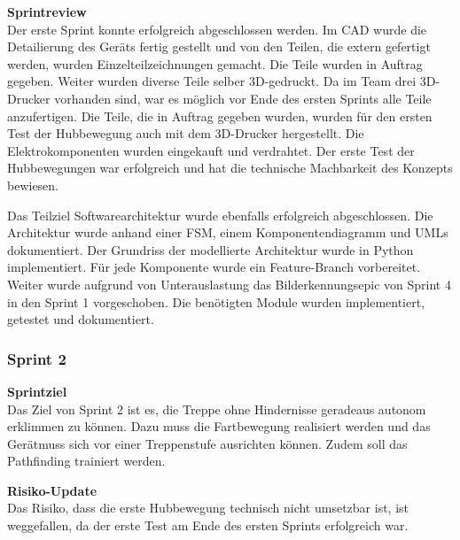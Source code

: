 \textbf{Sprintreview}\\
Der erste Sprint konnte erfolgreich abgeschlossen werden. Im CAD wurde die Detailierung des Geräts fertig gestellt und von den Teilen, die extern gefertigt werden, wurden Einzelteilzeichnungen gemacht. Die Teile wurden in Auftrag gegeben. Weiter wurden diverse Teile selber 3D-gedruckt. Da im Team drei 3D-Drucker vorhanden sind, war es möglich vor Ende des ersten Sprints alle Teile anzufertigen. Die Teile, die in Auftrag gegeben wurden, wurden für den ersten Test der Hubbewegung auch mit dem 3D-Drucker hergestellt.
Die Elektrokomponenten wurden eingekauft und verdrahtet.
Der erste Test der Hubbewegungen war erfolgreich und hat die technische Machbarkeit des Konzepts bewiesen.

Das Teilziel Softwarearchitektur wurde ebenfalls erfolgreich abgeschlossen. Die Architektur wurde anhand einer FSM, einem Komponentendiagramm und UMLs dokumentiert. Der Grundriss der modellierte Architektur wurde in Python implementiert. Für jede Komponente wurde ein Feature-Branch vorbereitet. 
Weiter wurde aufgrund von Unterauslastung das Bilderkennungsepic von Sprint 4 in den Sprint 1 vorgeschoben. Die benötigten Module wurden implementiert, getestet und dokumentiert. 

\subsubsection{Sprint 2}
\textbf{Sprintziel}\\
Das Ziel von Sprint 2 ist es, die Treppe ohne Hindernisse geradeaus autonom erklimmen zu können. Dazu muss die Fartbewegung realisiert werden und das Gerätmuss sich vor einer Treppenstufe ausrichten können. Zudem soll das Pathfinding trainiert werden.

\textbf{Risiko-Update}\\
Das Risiko, dass die erste Hubbewegung technisch nicht umsetzbar ist, ist weggefallen, da der erste Test am Ende des ersten Sprints erfolgreich war.

